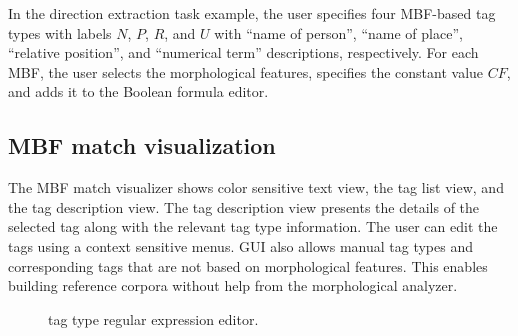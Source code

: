 In the direction extraction task example, the user specifies four MBF-based 
tag types with labels 
$N$, $P$, $R$, and $U$ with  ``name of person'', ``name of place'', 
``relative position'', and ``numerical term'' descriptions, respectively. 
For each MBF, the user selects the morphological features, 
specifies the constant value $CF$, and adds it to the Boolean formula editor. 
%

\subsection{MBF match visualization}

The MBF match visualizer shows color sensitive text view, the tag list view, and the tag description view. 
The tag description view presents the details of the selected tag along with 
the relevant tag type information.
%
The user can edit the tags using a context sensitive menus. 
\framework GUI also allows manual tag types and corresponding tags 
that are not based on morphological features.
This enables building reference corpora without 
help from the morphological analyzer.

\begin{figure}[tb]
  \centering
  {\setlength{\fboxsep}{0pt}%
  \setlength{\fboxrule}{0.5pt}%
  }
  \vspace{-2em}
  \caption{\label{f:sfe}\framework tag type regular expression editor.}
\end{figure}

